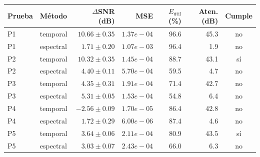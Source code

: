 \begin{tabular}{llrrrrc}
\toprule
Prueba & Método & $\Delta$SNR (dB) & MSE & $E_{\text{útil}}$ (\%) & Aten. (dB) & Cumple \\
\midrule
P1 & temporal & $10.66 \pm 0.35$ & $1.37e-04$ & 96.6 & 45.3 & no \\
P1 & espectral & $1.71 \pm 0.20$ & $1.07e-03$ & 96.4 & 1.9 & no \\
P2 & temporal & $10.32 \pm 0.35$ & $1.45e-04$ & 88.7 & 43.1 & sí \\
P2 & espectral & $4.40 \pm 0.11$ & $5.70e-04$ & 59.5 & 4.7 & no \\
P3 & temporal & $4.35 \pm 0.31$ & $1.91e-04$ & 71.4 & 42.7 & no \\
P3 & espectral & $5.31 \pm 0.05$ & $1.53e-04$ & 54.8 & 6.4 & no \\
P4 & temporal & $-2.56 \pm 0.09$ & $1.70e-05$ & 86.4 & 42.8 & no \\
P4 & espectral & $1.72 \pm 0.29$ & $6.00e-06$ & 87.4 & 4.6 & no \\
P5 & temporal & $3.64 \pm 0.06$ & $2.11e-04$ & 80.9 & 43.5 & sí \\
P5 & espectral & $3.03 \pm 0.07$ & $2.43e-04$ & 66.0 & 6.3 & no \\
\bottomrule
\end{tabular}
